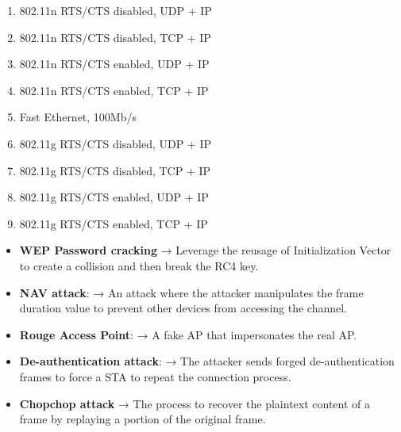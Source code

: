 \begin{solution}
    \begin{enumerate}
        \item 802.11n RTS/CTS disabled, UDP + IP
        \item 802.11n RTS/CTS disabled, TCP + IP
        \item 802.11n RTS/CTS enabled, UDP + IP
        \item 802.11n RTS/CTS enabled, TCP + IP
        \item Fast Ethernet, 100Mb/s
        \item 802.11g RTS/CTS disabled, UDP + IP
        \item 802.11g RTS/CTS disabled, TCP + IP
        \item 802.11g RTS/CTS enabled, UDP + IP
        \item 802.11g RTS/CTS enabled, TCP + IP
    \end{enumerate}
\end{solution}


\begin{solution}
    \begin{itemize}
        \item \textbf{WEP Password cracking} → Leverage the reusage of Initialization Vector to create a collision and then break the RC4 key.

        \item \textbf{NAV attack}: → An attack where the attacker manipulates the frame duration value to prevent other devices from accessing the channel.
    
        \item \textbf{Rouge Access Point}: → A fake AP that impersonates the real AP.
    
        \item \textbf{De-authentication attack}: → The attacker sends forged de-authentication frames to force a STA to repeat the connection process.
    
        \item \textbf{Chopchop attack} → The process to recover the plaintext content of a frame by replaying a portion of the original frame.
    \end{itemize}

\end{solution}


